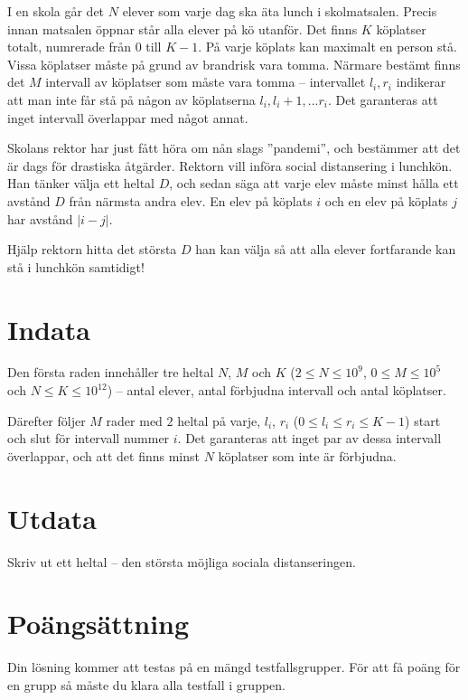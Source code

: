 
I en skola går det $N$ elever som varje dag ska äta lunch i skolmatsalen.
Precis innan matsalen öppnar står alla elever på kö utanför.
Det finns $K$ köplatser totalt, numrerade från $0$ till $K-1$.
På varje köplats kan maximalt en person stå.
Vissa köplatser måste på grund av brandrisk vara tomma.
Närmare bestämt finns det $M$ intervall av köplatser som måste vara tomma --
intervallet $l_i,r_i$ indikerar att man inte får stå på någon av köplatserna $l_i,l_i+1,...r_i$.
Det garanteras att inget intervall överlappar med något annat.

Skolans rektor har just fått höra om nån slags ”pandemi”, och bestämmer att det är dags för drastiska åtgärder.
Rektorn vill införa social distansering i lunchkön.
Han tänker välja ett heltal $D$, och sedan säga att varje elev måste minst hålla ett avstånd $D$ från närmsta andra elev.
En elev på köplats $i$ och en elev på köplats $j$ har avstånd $|i-j|$.

Hjälp rektorn hitta det största $D$ han kan välja så att alla elever fortfarande kan stå i lunchkön samtidigt!


\section*{Indata}
Den första raden innehåller tre heltal $N$, $M$ och $K$ ($2 \leq N \leq 10^9$, $0 \leq M \leq 10^5$ och $N \leq K \leq 10^{12}$) --
antal elever, antal förbjudna intervall och antal köplatser.

Därefter följer $M$ rader med $2$ heltal på varje, $l_i$, $r_i$  ($0 \le l_i \le r_i \le K-1$) start och slut för intervall nummer $i$.
Det garanteras att inget par av dessa intervall överlappar, och att det finns minst $N$ köplatser som inte är förbjudna.

\section*{Utdata}
Skriv ut ett heltal -- den största möjliga sociala distanseringen.

\section*{Poängsättning}
Din lösning kommer att testas på en mängd testfallsgrupper.
För att få poäng för en grupp så måste du klara alla testfall i gruppen.

